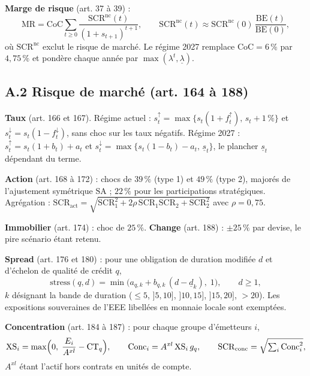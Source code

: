 \textbf{Marge de risque} (art. 37 à 39) :
\[
\mathrm{MR} = \mathrm{CoC} \sum_{t\ge 0} \frac{\mathrm{SCR}^{\text{nc}}(t)}{(1+s_{t+1})^{t+1}},
\qquad
\mathrm{SCR}^{\text{nc}}(t) \approx \mathrm{SCR}^{\text{nc}}(0)\,\frac{\mathrm{BE}(t)}{\mathrm{BE}(0)} ,
\]
où $\mathrm{SCR}^{\text{nc}}$ exclut le risque de marché. Le régime 2027 remplace
$\mathrm{CoC}=6\,\%$ par $4{,}75\,\%$ et pondère chaque année par
$\max(\lambda^{t}, \underline{\lambda})$.

\subsection*{A.2 Risque de marché (art. 164 à 188)}

\textbf{Taux} (art. 166 et 167). Régime actuel : $s_t^{\uparrow} = \max\{s_t(1+f^{\uparrow}_t),\,
s_t + 1\,\%\}$ et $s_t^{\downarrow} = s_t(1-f^{\downarrow}_t)$, sans choc sur les taux négatifs.
Régime 2027 : $s_t^{\uparrow} = s_t(1+b_t) + a_t$ et
$s_t^{\downarrow} = \max\{s_t(1-b_t) - a_t,\, \underline{s}_t\}$, le plancher $\underline{s}_t$
dépendant du terme.

\textbf{Action} (art. 168 à 172) : chocs de $39\,\%$ (type 1) et $49\,\%$ (type 2), majorés de
l'ajustement symétrique $\mathrm{SA}$ ; $22\,\%$ pour les participations stratégiques.
Agrégation :
$\mathrm{SCR}_{\text{act}} = \sqrt{\mathrm{SCR}_1^2 + 2\rho\,\mathrm{SCR}_1\mathrm{SCR}_2
+ \mathrm{SCR}_2^2}$ avec $\rho = 0{,}75$.

\textbf{Immobilier} (art. 174) : choc de $25\,\%$. \quad
\textbf{Change} (art. 188) : $\pm 25\,\%$ par devise, le pire scénario étant retenu.

\textbf{Spread} (art. 176 et 180) : pour une obligation de duration modifiée $d$ et d'échelon
de qualité de crédit $q$,
\[
\mathrm{stress}(q,d) = \min\bigl(a_{q,k} + b_{q,k}\,(d - \underline{d}_k),\; 1\bigr),
\qquad d \ge 1,
\]
$k$ désignant la bande de duration ($\le 5$, $]5,10]$, $]10,15]$, $]15,20]$, $>20$). Les
expositions souveraines de l'EEE libellées en monnaie locale sont exemptées.

\textbf{Concentration} (art. 184 à 187) : pour chaque groupe d'émetteurs $i$,
\[
\mathrm{XS}_i = \max\Bigl(0,\; \frac{E_i}{A^{xl}} - \mathrm{CT}_{q}\Bigr),
\qquad
\mathrm{Conc}_i = A^{xl}\,\mathrm{XS}_i\, g_{q},
\qquad
\mathrm{SCR}_{\text{conc}} = \sqrt{\textstyle\sum_i \mathrm{Conc}_i^2},
\]
$A^{xl}$ étant l'actif hors contrats en unités de compte.

